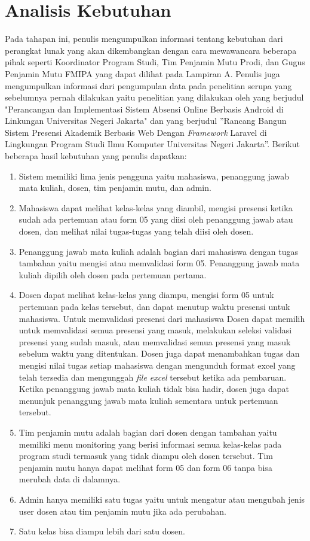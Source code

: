 \section{Analisis Kebutuhan }
Pada tahapan ini, penulis mengumpulkan informasi tentang kebutuhan dari perangkat lunak yang akan dikembangkan dengan cara mewawancara beberapa pihak seperti Koordinator Program Studi, Tim Penjamin Mutu Prodi, dan Gugus Penjamin Mutu FMIPA yang dapat dilihat pada Lampiran A. Penulis juga mengumpulkan informasi dari pengumpulan data pada penelitian serupa yang sebelumnya pernah dilakukan yaitu penelitian yang dilakukan oleh \cite{FitriAndiniMedIrzal2017} yang berjudul "Perancangan dan Implementasi Sistem Absensi Online Berbasis Android di Linkungan Universitas Negeri Jakarta"  dan \cite{Kultsum2021} yang berjudul ''Rancang Bangun Sistem Presensi Akademik Berbasis Web Dengan \textit{Framework} Laravel di Lingkungan Program Studi Ilmu Komputer Universitas Negeri Jakarta''. Berikut beberapa hasil kebutuhan yang penulis dapatkan:

\begin{enumerate}
	\item Sistem memiliki lima jenis pengguna yaitu mahasiswa, penanggung jawab mata kuliah, dosen, tim penjamin mutu, dan admin.
	\item Mahasiswa dapat melihat kelas-kelas yang diambil, mengisi presensi ketika sudah ada pertemuan atau form 05 yang diisi oleh penanggung jawab atau dosen, dan melihat nilai tugas-tugas yang telah diisi oleh dosen.
	\item Penanggung jawab mata kuliah adalah bagian dari mahasiswa dengan tugas tambahan yaitu  mengisi atau memvalidasi form 05. Penanggung jawab mata kuliah dipilih oleh dosen pada pertemuan pertama.
	\item Dosen dapat melihat kelas-kelas yang diampu, mengisi form 05 untuk pertemuan pada kelas tersebut, dan dapat menutup waktu presensi untuk mahasiswa. Untuk memvalidasi presensi dari mahasiswa Dosen dapat memilih untuk memvalidasi semua presensi yang masuk, melakukan seleksi validasi presensi yang sudah masuk, atau memvalidasi semua presensi yang masuk sebelum waktu yang ditentukan.  Dosen juga dapat menambahkan tugas dan mengisi nilai tugas setiap mahasiswa dengan mengunduh format excel yang telah tersedia dan mengunggah \textit{file excel} tersebut ketika ada pembaruan. Ketika penanggung jawab mata kuliah tidak bisa hadir, dosen juga dapat menunjuk penanggung jawab mata kuliah sementara untuk pertemuan tersebut.
	\item Tim penjamin mutu adalah bagian dari dosen dengan tambahan yaitu memiliki menu monitoring yang berisi informasi semua kelas-kelas pada program studi termasuk yang tidak diampu oleh dosen tersebut. Tim penjamin mutu hanya dapat melihat form 05 dan form 06 tanpa bisa merubah data di dalamnya.
	\item Admin hanya memiliki satu tugas yaitu untuk mengatur atau mengubah jenis user dosen atau tim penjamin mutu jika ada perubahan.
	\item Satu kelas bisa diampu lebih dari satu dosen.
	
\end{enumerate}


